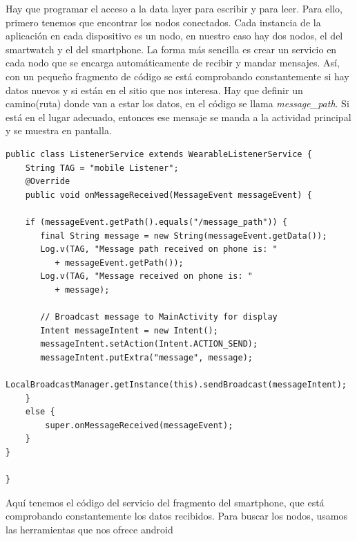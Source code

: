 \documentclass[12pt]{article}
\numberwithin{equation}{section}
\begin{document}
Hay que programar el acceso a la data layer para escribir y para leer. Para ello, primero tenemos que encontrar los nodos conectados. Cada instancia de la aplicación en cada dispositivo es un nodo, en nuestro caso hay dos nodos, el del smartwatch y el del smartphone. La forma más sencilla es crear un servicio en cada nodo que se encarga automáticamente de recibir y mandar mensajes. Así, con un pequeño fragmento de código se está comprobando constantemente si hay datos nuevos y si están en el sitio que nos interesa. Hay que definir un camino(ruta) donde van a estar los datos, en el código se llama \textit{message\_path}. Si está en el lugar adecuado, entonces ese mensaje se manda a la actividad principal y se muestra en pantalla.


\begin{lstlisting}
public class ListenerService extends WearableListenerService {
    String TAG = "mobile Listener";
    @Override
    public void onMessageReceived(MessageEvent messageEvent) {

    if (messageEvent.getPath().equals("/message_path")) {
       final String message = new String(messageEvent.getData());
       Log.v(TAG, "Message path received on phone is: "
          + messageEvent.getPath());
       Log.v(TAG, "Message received on phone is: "
          + message);

       // Broadcast message to MainActivity for display
       Intent messageIntent = new Intent();
       messageIntent.setAction(Intent.ACTION_SEND);
       messageIntent.putExtra("message", message);
       LocalBroadcastManager.getInstance(this).sendBroadcast(messageIntent);
    }
    else {
        super.onMessageReceived(messageEvent);
    }
}

}

\end{lstlisting}


Aquí tenemos el código del servicio del fragmento del smartphone, que está comprobando constantemente los datos recibidos. Para buscar los nodos, usamos las herramientas que nos ofrece android
\end{document}
